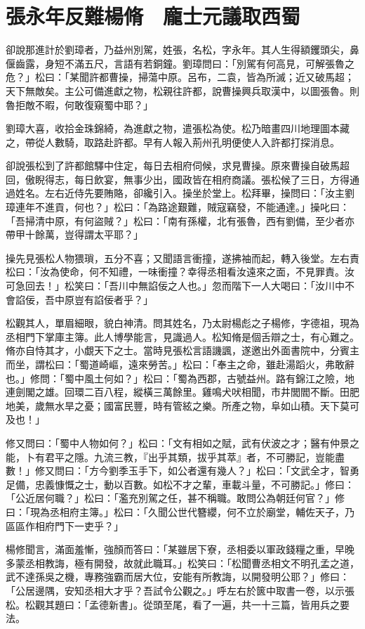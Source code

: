 
\chapter{張永年反難楊脩　龐士元議取西蜀}

卻說那進計於劉璋者，乃益州別駕，姓張，名松，字永年。其人生得額钁頭尖，鼻偃齒露，身短不滿五尺，言語有若銅鐘。劉璋問曰：「別駕有何高見，可解張魯之危？」松曰：「某聞許都曹操，掃蕩中原。呂布，二袁，皆為所滅；近又破馬超；天下無敵矣。主公可備進獻之物，松親往許都，說曹操興兵取漢中，以圖張魯。則魯拒敵不暇，何敢復窺蜀中耶？」

劉璋大喜，收拾金珠錦綺，為進獻之物，遣張松為使。松乃暗畫四川地理圖本藏之，帶從人數騎，取路赴許都。早有人報入荊州孔明便使人入許都打探消息。

卻說張松到了許都館驛中住定，每日去相府伺候，求見曹操。原來曹操自破馬超回，傲睨得志，每日飲宴，無事少出，國政皆在相府商議。張松候了三日，方得通過姓名。左右近侍先要賄賂，卻纔引入。操坐於堂上。松拜畢，操問曰：「汝主劉璋連年不進貢，何也？」松曰：「為路途艱難，賊寇竊發，不能通達。」操叱曰：「吾掃清中原，有何盜賊？」松曰：「南有孫權，北有張魯，西有劉備，至少者亦帶甲十餘萬，豈得謂太平耶？」

操先見張松人物猥瑣，五分不喜；又聞語言衝撞，遂拂袖而起，轉入後堂。左右責松曰：「汝為使命，何不知禮，一味衝撞？幸得丞相看汝遠來之面，不見罪責。汝可急回去！」松笑曰：「吾川中無諂佞之人也。」忽而階下一人大喝曰：「汝川中不會諂佞，吾中原豈有諂佞者乎？」

松觀其人，單眉細眼，貌白神清。問其姓名，乃太尉楊彪之子楊修，字德祖，現為丞相門下掌庫主簿。此人博學能言，見識過人。松知脩是個舌辯之士，有心難之。脩亦自恃其才，小覷天下之士。當時見張松言語譏諷，遂邀出外面書院中，分賓主而坐，謂松曰：「蜀道崎嶇，遠來勞苦。」松曰：「奉主之命，雖赴湯蹈火，弗敢辭也。」修問：「蜀中風土何如？」松曰：「蜀為西郡，古號益州。路有錦江之險，地連劍閣之雄。回環二百八程，縱橫三萬餘里。雞鳴犬吠相聞，市井閭閻不斷。田肥地美，歲無水旱之憂；國富民豐，時有管絃之樂。所產之物，阜如山積。天下莫可及也！」

修又問曰：「蜀中人物如何？」松曰：「文有相如之賦，武有伏波之才；醫有仲景之能，卜有君平之隱。九流三教，『出乎其類，拔乎其萃』者，不可勝記，豈能盡數！」修又問曰：「方今劉季玉手下，如公者還有幾人？」松曰：「文武全才，智勇足備，忠義慷慨之士，動以百數。如松不才之輩，車載斗量，不可勝記。」修曰：「公近居何職？」松曰：「濫充別駕之任，甚不稱職。敢問公為朝廷何官？」修曰：「現為丞相府主簿。」松曰：「久聞公世代簪纓，何不立於廟堂，輔佐天子，乃區區作相府門下一吏乎？」

楊修聞言，滿面羞慚，強顏而答曰：「某雖居下寮，丞相委以軍政錢糧之重，早晚多蒙丞相教誨，極有開發，故就此職耳。」松笑曰：「松聞曹丞相文不明孔孟之道，武不達孫吳之機，專務強霸而居大位，安能有所教誨，以開發明公耶？」修曰：「公居邊隅，安知丞相大才乎？吾試令公觀之。」呼左右於篋中取書一卷，以示張松。松觀其題曰：「孟德新書」。從頭至尾，看了一遍，共一十三篇，皆用兵之要法。

